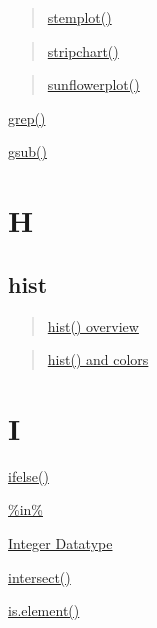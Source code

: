 \documentclass[]{book}
\begin{document}
\begin{quote}
\href{https://linkedin-learning.pxf.io/rweekly_stemplot}{stemplot()}
\end{quote}

\begin{quote}
\href{linkedin-learning.pxf.io/rweekly_stripchart}{stripchart()}
\end{quote}

\begin{quote}
\href{https://linkedin-learning.pxf.io/rweekly_sunflower}{sunflowerplot()}
\end{quote}

\href{https://linkedin-learning.pxf.io/rweekly_grep}{grep()}

\href{https://linkedin-learning.pxf.io/rweekly_grep}{gsub()}

\hypertarget{h}{%
\chapter*{H}\label{h}}

\hypertarget{hist}{%
\section*{hist}\label{hist}}

\begin{quote}
\href{linkedin-learning.pxf.io/rweekly_histogram}{hist() overview}
\end{quote}

\begin{quote}
\href{https://linkedin-learning.pxf.io/rwkly_colors}{hist() and colors}
\end{quote}

\hypertarget{i}{%
\chapter*{I}\label{i}}

\href{https://linkedin-learning.pxf.io/rweekly_ifelse}{ifelse()}

\href{https://linkedin-learning.pxf.io/rweekly_equalIn}{\%in\%}

\href{https://linkedin-learning.pxf.io/rweekly_atomics}{Integer Datatype}

\href{https://linkedin-learning.pxf.io/Rweekly_setsUnionInterDiff}{intersect()}

\href{https://linkedin-learning.pxf.io/rweekly_equalIn}{is.element()}
\end{document}
